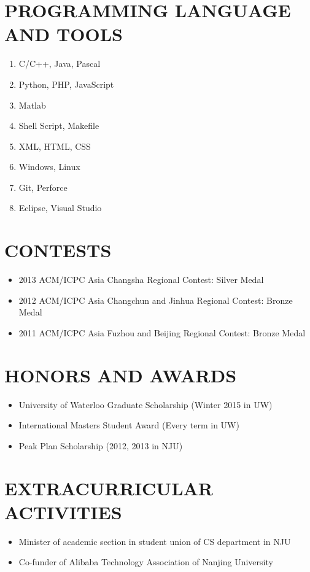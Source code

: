 \documentclass{res}
\begin{document}
\begin{resume}
\begin{enumerate}
  \end{enumerate}


\section{PROGRAMMING LANGUAGE AND TOOLS}
  \begin{multicols}{3}
    \begin{enumerate}
      \item C/C++, Java, Pascal
      \item Python, PHP, JavaScript
      \item Matlab
      \item Shell Script, Makefile
      \item XML, HTML, CSS
      \item Windows, Linux
      \item Git, Perforce
      \item Eclipse, Visual Studio
    \end{enumerate}
  \end{multicols}

\section{CONTESTS}
\begin{itemize}
\item 2013 ACM/ICPC Asia Changsha Regional Contest: Silver Medal
\item 2012 ACM/ICPC Asia Changchun and Jinhua Regional Contest: Bronze Medal
\item 2011 ACM/ICPC Asia Fuzhou and Beijing Regional Contest: Bronze Medal
\end{itemize}


\section{HONORS AND AWARDS}
\begin{itemize}
\item University of Waterloo Graduate Scholarship (Winter 2015 in UW)
\item International Masters Student Award (Every term in UW)
\item Peak Plan Scholarship (2012, 2013 in NJU)
\end{itemize}

\section{EXTRACURRICULAR ACTIVITIES}
\begin{itemize}
\item Minister of academic section in student union of CS department in NJU
\item Co-funder of Alibaba Technology Association of Nanjing University
\end{itemize}


\end{resume}
\end{document}
